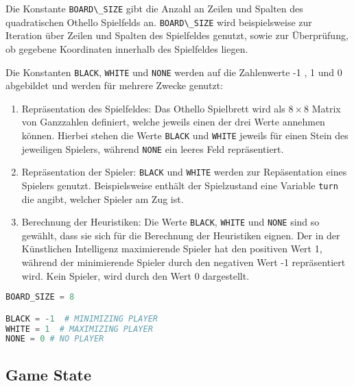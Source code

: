 Die Konstante \passthrough{\lstinline!BOARD\_SIZE!} gibt die Anzahl an
Zeilen und Spalten des quadratischen Othello Spielfelds an.
\passthrough{\lstinline!BOARD\_SIZE!} wird beispielsweise zur Iteration
über Zeilen und Spalten des Spielfeldes genutzt, sowie zur Überprüfung,
ob gegebene Koordinaten innerhalb des Spielfeldes liegen.

Die Konstanten \passthrough{\lstinline!BLACK!},
\passthrough{\lstinline!WHITE!} und \passthrough{\lstinline!NONE!}
werden auf die Zahlenwerte -1 , 1 und 0 abgebildet und werden für
mehrere Zwecke genutzt:

\begin{enumerate}
\def\labelenumi{\arabic{enumi}.}
\tightlist
\item
  Repräsentation des Spielfeldes: Das Othello Spielbrett wird als
  \(8\times 8\) Matrix von Ganzzahlen definiert, welche jeweils einen
  der drei Werte annehmen können. Hierbei stehen die Werte
  \passthrough{\lstinline!BLACK!} und \passthrough{\lstinline!WHITE!}
  jeweils für einen Stein des jeweiligen Spielers, während
  \passthrough{\lstinline!NONE!} ein leeres Feld repräsentiert.
\item
  Repräsentation der Spieler: \passthrough{\lstinline!BLACK!} und
  \passthrough{\lstinline!WHITE!} werden zur Repäsentation eines
  Spielers genutzt. Beispielsweise enthält der Spielzustand eine
  Variable \passthrough{\lstinline!turn!} die angibt, welcher Spieler am
  Zug ist.
\item
  Berechnung der Heuristiken: Die Werte \passthrough{\lstinline!BLACK!},
  \passthrough{\lstinline!WHITE!} und \passthrough{\lstinline!NONE!}
  sind so gewählt, dass sie sich für die Berechnung der Heuristiken
  eignen. Der in der Künstlichen Intelligenz maximierende Spieler hat
  den positiven Wert 1, während der minimierende Spieler durch den
  negativen Wert -1 repräsentiert wird. Kein Spieler, wird durch den
  Wert 0 dargestellt.
\end{enumerate}

\begin{lstlisting}[language=Python]
BOARD_SIZE = 8

BLACK = -1  # MINIMIZING PLAYER
WHITE = 1  # MAXIMIZING PLAYER
NONE = 0 # NO PLAYER
\end{lstlisting}

\hypertarget{game-state}{%
\subsection{Game State}\label{game-state}}

